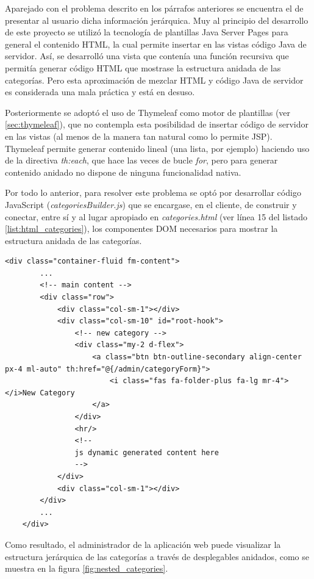 \documentclass[a4paper]{article}
\begin{document}
    Aparejado con el problema descrito en los párrafos anteriores se encuentra el de presentar al usuario dicha información jerárquica. Muy al principio del desarrollo de este proyecto se utilizó la tecnología de plantillas Java Server Pages para general el contenido HTML, la cual permite insertar en las vistas código Java de servidor. Así, se desarrolló una vista que contenía una función recursiva que permitía generar código HTML que mostrase la estructura anidada de las categorías. Pero esta aproximación de mezclar HTML y código Java de servidor es considerada una mala práctica y está en desuso.
    
    Posteriormente se adoptó el uso de Thymeleaf como motor de plantillas (ver \ref{sec:thymeleaf}), que no contempla esta posibilidad de insertar código de servidor en las vistas (al menos de la manera tan natural como lo permite JSP). Thymeleaf permite generar contenido lineal (una lista, por ejemplo) haciendo uso de la directiva \emph{th:each}, que hace las veces de bucle \emph{for}, pero para generar contenido anidado no dispone de ninguna funcionalidad nativa.
    
    Por todo lo anterior, para resolver este problema se optó por desarrollar código JavaScript (\emph{categoriesBuilder.js}) que se encargase, en el cliente, de construir y conectar, entre sí y al lugar apropiado en \emph{categories.html} (ver línea 15 del listado \ref{list:html_categories}), los componentes DOM necesarios para mostrar la estructura anidada de las categorías.
    \\
    
    \begin{lstlisting}[caption=Contenido principal de la vista categories.html,label=list:html_categories]
    <div class="container-fluid fm-content">
	    ...
	    <!-- main content -->
	    <div class="row">
		    <div class="col-sm-1"></div>
		    <div class="col-sm-10" id="root-hook">
			    <!-- new category -->
			    <div class="my-2 d-flex">
				    <a class="btn btn-outline-secondary align-center px-4 ml-auto" th:href="@{/admin/categoryForm}">
				    	<i class="fas fa-folder-plus fa-lg mr-4"></i>New Category
				    </a>
			    </div>
			    <hr/>
			    <!--
			    js dynamic generated content here
			    -->
		    </div>
		    <div class="col-sm-1"></div>
	    </div>
	    ...
    </div>
    \end{lstlisting}
    
    Como resultado, el administrador de la aplicación web puede visualizar la estructura jerárquica de las categorías a través de desplegables anidados, como se muestra en la figura \ref{fig:nested_categories}.
    
\end{document}
